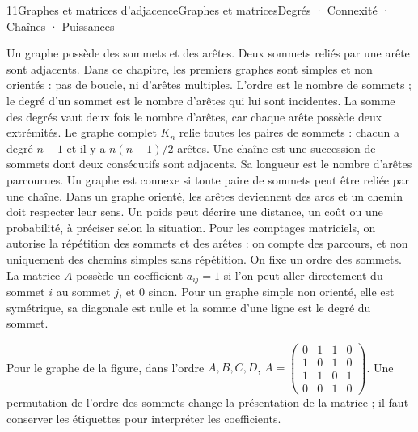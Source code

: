 \begin{ouverture}[denombrement]{11}{Graphes et matrices d’adjacence}{Graphes et matrices}{Degrés · Connexité · Chaînes · Puissances}
\end{ouverture}
\essentiel

Un graphe possède des sommets et des arêtes. Deux sommets reliés par une arête sont adjacents.
Dans ce chapitre, les premiers graphes sont simples et non orientés : pas de boucle, ni d'arêtes multiples.
L'ordre est le nombre de sommets ; le degré d'un sommet est le nombre d'arêtes qui lui sont incidentes.
La somme des degrés vaut deux fois le nombre d'arêtes, car chaque arête possède deux extrémités.
Le graphe complet $K_n$ relie toutes les paires de sommets : chacun a degré $n-1$ et il y a $n(n-1)/2$ arêtes.
Une chaîne est une succession de sommets dont deux consécutifs sont adjacents. Sa longueur est le nombre d'arêtes parcourues.
Un graphe est connexe si toute paire de sommets peut être reliée par une chaîne.
Dans un graphe orienté, les arêtes deviennent des arcs et un chemin doit respecter leur sens. Un poids peut décrire une distance, un coût ou une probabilité, à préciser selon la situation.
Pour les comptages matriciels, on autorise la répétition des sommets et des arêtes : on compte des parcours, et non uniquement des chemins simples sans répétition.
On fixe un ordre des sommets. La matrice $A$ possède un coefficient $a_{ij}=1$ si l'on peut aller directement du sommet $i$ au sommet $j$, et $0$ sinon.
Pour un graphe simple non orienté, elle est symétrique, sa diagonale est nulle et la somme d'une ligne est le degré du sommet.
\begin{exemple}
Pour le graphe de la figure, dans l'ordre $A,B,C,D$,
$A=\begin{pmatrix}0&1&1&0\\1&0&1&0\\1&1&0&1\\0&0&1&0\end{pmatrix}$.
Une permutation de l'ordre des sommets change la présentation de la matrice ; il faut conserver les étiquettes pour interpréter les coefficients.
\end{exemple}
